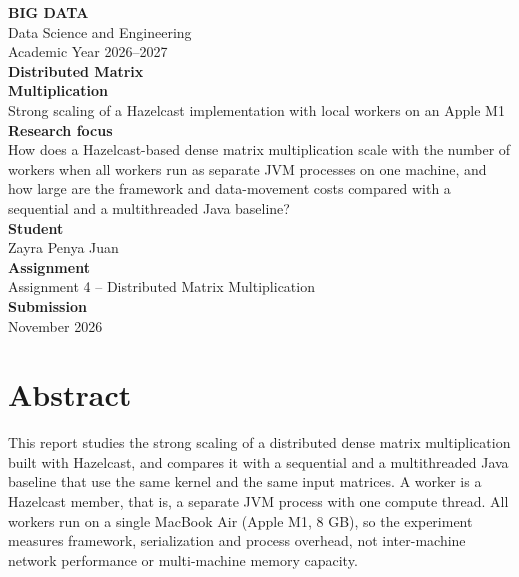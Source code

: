 \documentclass[11pt,a4paper]{article}
\begin{document}
\begin{titlepage}
\thispagestyle{empty}
\vspace*{1cm}
{\color{navy}\Large\bfseries BIG DATA}\\[2pt]
{\large Data Science and Engineering}\\[2pt]
{\large Academic Year 2026--2027}\\[2.5cm]

{\color{navy}\fontsize{30}{36}\selectfont\bfseries Distributed Matrix\\ Multiplication}\\[0.6cm]
{\Large Strong scaling of a Hazelcast implementation with local workers on an Apple M1}\\[2cm]

\textbf{Research focus}\\[4pt]
How does a Hazelcast-based dense matrix multiplication scale with the number of workers
when all workers run as separate JVM processes on one machine, and how large are the
framework and data-movement costs compared with a sequential and a multithreaded Java
baseline?\\[1.5cm]

\textbf{Student}\\ Zayra Penya Juan\\[0.8cm]
\textbf{Assignment}\\ Assignment 4 -- Distributed Matrix Multiplication\\[0.8cm]
\textbf{Submission}\\ November 2026
\end{titlepage}

\tableofcontents
\newpage
\listoffigures
\listoftables
\newpage

\section*{Abstract}
This report studies the strong scaling of a distributed dense matrix multiplication built
with Hazelcast, and compares it with a sequential and a multithreaded Java baseline that use
the same kernel and the same input matrices. A worker is a Hazelcast member, that is, a
separate JVM process with one compute thread. All workers run on a single MacBook Air (Apple
M1, 8 GB), so the experiment measures framework, serialization and process overhead, not
inter-machine network performance or multi-machine memory capacity.
\end{document}
